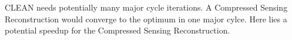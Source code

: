 CLEAN needs potentially many major cycle iterations. A Compressed Sensing Reconstruction would converge to the optimum in one major cylce. Here lies a potential speedup for the Compressed Sensing Reconstruction.







 
